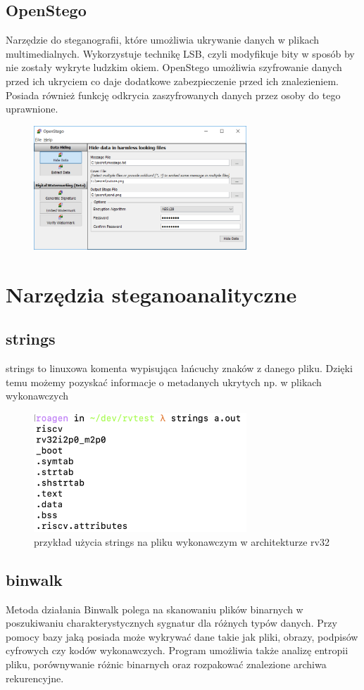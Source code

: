 \documentclass{article}
\begin{document}
\subsection{OpenStego}
Narzędzie do steganografii, które umożliwia ukrywanie danych w plikach multimedialnych. Wykorzystuje technikę LSB, czyli modyfikuje bity w sposób by nie zostały wykryte ludzkim okiem. OpenStego umożliwia szyfrowanie danych przed ich ukryciem co daje dodatkowe zabezpieczenie przed ich znalezieniem. Posiada również funkcję odkrycia zaszyfrowanych danych przez osoby do tego uprawnione.
\begin{figure}[H]
	\centering
	\includegraphics[width=8cm]{OpenStego.png}
\end{figure}
\section{Narzędzia steganoanalityczne}
\subsection{strings}
strings to linuxowa komenta wypisująca łańcuchy znaków z danego pliku. Dzięki temu możemy pozyskać informacje 
o metadanych ukrytych np. w plikach wykonawczych
\begin{figure}[H]
	\centering
	\includegraphics[width=8cm]{strings_example}
	\caption{przykład użycia strings na pliku wykonawczym w architekturze rv32}
\end{figure}
\subsection{binwalk}
Metoda działania Binwalk polega na skanowaniu plików binarnych w poszukiwaniu charakterystycznych sygnatur dla różnych typów danych. Przy pomocy bazy jaką posiada może wykrywać dane takie jak pliki, obrazy, podpisów cyfrowych czy kodów wykonawczych.
Program umożliwia także analizę entropii pliku, porównywanie różnic binarnych oraz rozpakować znalezione archiwa rekurencyjne.
\end{document}
